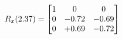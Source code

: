 \documentclass[preview]{standalone}
\begin{document}
\begin{align*}
\special{dvisvgm:raw <g id='unique000'>}R_{x}(2.37) = \begin{bmatrix}1 & 0 & 0 \\0 & -0.72 & -0.69 \\0 & +0.69 & -0.72\end{bmatrix}\special{dvisvgm:raw </g>}
\end{align*}
\end{document}
